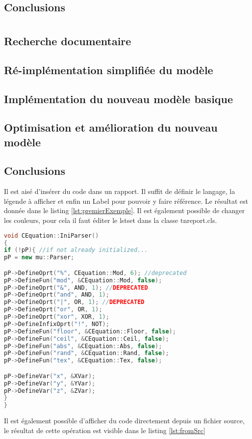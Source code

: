 \subsection{Conclusions}

\section{}
\subsection{Recherche documentaire} %
\subsection{Ré-implémentation simplifiée du modèle } %
\subsection{Implémentation du nouveau modèle basique} %
\subsection{Optimisation et amélioration du nouveau modèle}
\subsection{Conclusions}


Il est aisé d'insérer du code dans un rapport. Il suffit de définir le langage, la légende à afficher et enfin un Label pour pouvoir y faire référence. Le résultat est donnée dans le listing \ref{lst:premierExemple}. Il est également possible de changer les couleurs, pour cela il faut éditer le lstset dans la classe tnreport.cls.

\begin{lstlisting}[language=c++, caption={Premier Exemple}, label={lst:premierExemple}]
void CEquation::IniParser()
{
if (!pP){ //if not already initialized...
pP = new mu::Parser;

pP->DefineOprt("%", CEquation::Mod, 6); //deprecated
pP->DefineFun("mod", &CEquation::Mod, false);
pP->DefineOprt("&", AND, 1); //DEPRECATED
pP->DefineOprt("and", AND, 1);
pP->DefineOprt("|", OR, 1); //DEPRECATED
pP->DefineOprt("or", OR, 1);
pP->DefineOprt("xor", XOR, 1);
pP->DefineInfixOprt("!", NOT);
pP->DefineFun("floor", &CEquation::Floor, false);
pP->DefineFun("ceil", &CEquation::Ceil, false);
pP->DefineFun("abs", &CEquation::Abs, false);
pP->DefineFun("rand", &CEquation::Rand, false);
pP->DefineFun("tex", &CEquation::Tex, false);

pP->DefineVar("x", &XVar);
pP->DefineVar("y", &YVar);
pP->DefineVar("z", &ZVar);
}
}
\end{lstlisting}
\clearpage
Il est également possible d'afficher du code directement depuis un fichier source, le résultat de cette opération est visible dans le listing \ref{lst:fromSrc}
%